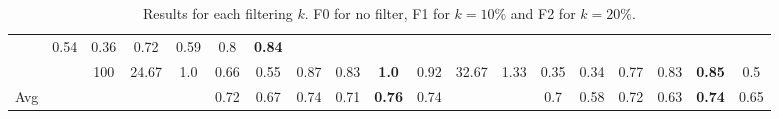\documentclass[letterpaper]{article}
\begin{document}
\begin{table*}[]
\begin{tabular}{ccccccccccccccccccc}
 & 0.54
 & 0.36
 & 0.72
 & 0.59
 & 0.8
 & \textbf{0.84}
\\ & & 100 & 24.67 & 1.0

 & 0.66
 & 0.55
 & 0.87
 & 0.83
 & \textbf{1.0}
 & 0.92 & 32.67 & 1.33

 & 0.35
 & 0.34
 & 0.77
 & 0.83
 & \textbf{0.85}
 & 0.5 \\ \hline
Avg & &  & &  & 0.72 & 0.67 & 0.74 & 0.71 & \textbf{0.76} & 0.74 & &  & 0.7 & 0.58 & 0.72 & 0.63 & \textbf{0.74} & 0.65\\
\bottomrule
\end{tabular}\\
\caption{Results for each filtering $k$. F0 for no filter, F1 for $k=10\%$ and F2 for $k=20\%$.}
\end{table*}
\end{document}
